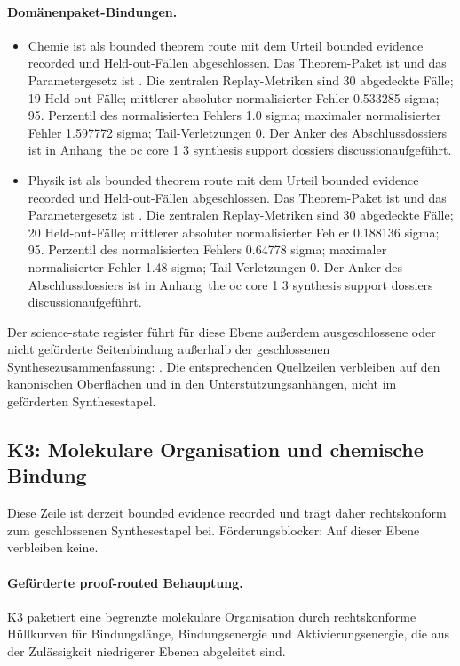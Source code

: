 \paragraph{Domänenpaket-Bindungen.}
\begin{itemize}[leftmargin=1.6em,nosep]
\item Chemie ist als bounded theorem route mit dem Urteil bounded evidence recorded und  Held-out-Fällen abgeschlossen. Das Theorem-Paket ist  und das Parametergesetz ist . Die zentralen Replay-Metriken sind 30 abgedeckte Fälle; 19 Held-out-Fälle; mittlerer absoluter normalisierter Fehler 0.533285 sigma; 95. Perzentil des normalisierten Fehlers 1.0 sigma; maximaler normalisierter Fehler 1.597772 sigma; Tail-Verletzungen 0. Der Anker des Abschlussdossiers ist in Anhang~the oc core 1 3 synthesis support dossiers discussionaufgeführt.
\item Physik ist als bounded theorem route mit dem Urteil bounded evidence recorded und  Held-out-Fällen abgeschlossen. Das Theorem-Paket ist  und das Parametergesetz ist . Die zentralen Replay-Metriken sind 30 abgedeckte Fälle; 20 Held-out-Fälle; mittlerer absoluter normalisierter Fehler 0.188136 sigma; 95. Perzentil des normalisierten Fehlers 0.64778 sigma; maximaler normalisierter Fehler 1.48 sigma; Tail-Verletzungen 0. Der Anker des Abschlussdossiers ist in Anhang~the oc core 1 3 synthesis support dossiers discussionaufgeführt.
\end{itemize}
Der science-state register führt für diese Ebene außerdem  ausgeschlossene oder nicht geförderte Seitenbindung außerhalb der geschlossenen Synthesezusammenfassung: . Die entsprechenden Quellzeilen verbleiben auf den kanonischen Oberflächen und in den Unterstützungsanhängen, nicht im geförderten Synthesestapel.

\subsection{K3: Molekulare Organisation und chemische Bindung}
\label{sec:oc-core-1-3-synthesis-k3}
Diese Zeile ist derzeit bounded evidence recorded und trägt daher rechtskonform zum geschlossenen Synthesestapel bei.
Förderungsblocker: Auf dieser Ebene verbleiben keine.

\paragraph{Geförderte proof-routed Behauptung.}
K3 paketiert eine begrenzte molekulare Organisation durch rechtskonforme Hüllkurven für Bindungslänge, Bindungsenergie und Aktivierungsenergie, die aus der Zulässigkeit niedrigerer Ebenen abgeleitet sind.

